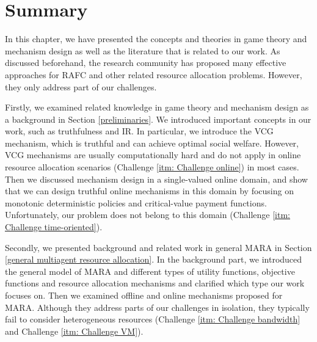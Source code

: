 \documentclass[11pt]{phdthesis}
\begin{document}
\section{Summary} \label{literature review summary}

In this chapter, we have presented the concepts and theories in game theory and mechanism design as well as the literature that is related to our work. As discussed beforehand, the research community has proposed many effective approaches for RAFC and other related resource allocation problems. However, they only address part of our challenges.

Firstly, we examined related knowledge in game theory and mechanism design as a background in Section \ref{preliminaries}. We introduced important concepts in our work, such as truthfulness and IR. In particular, we introduce the VCG mechanism, which is truthful and can achieve optimal social welfare. However, VCG mechanisms are usually computationally hard and do not apply in online resource allocation scenarios (Challenge \ref{itm: Challenge online}) in most cases. Then we discussed mechanism design in a single-valued online domain, and show that we can design truthful online mechanisms in this domain by focusing on monotonic deterministic policies and critical-value payment functions. Unfortunately, our problem does not belong to this domain (Challenge \ref{itm: Challenge time-oriented}).

Secondly, we presented background and related work in general MARA in Section \ref{general multiagent resource allocation}. In the background part, we introduced the general model of MARA and different types of utility functions, objective functions and resource allocation mechanisms and clarified which type our work focuses on. Then we examined offline and online mechanisms proposed for MARA. Although they address parts of our challenges in isolation, they typically fail to consider heterogeneous resources (Challenge \ref{itm: Challenge bandwidth} and Challenge \ref{itm: Challenge VM}).

\end{document}
